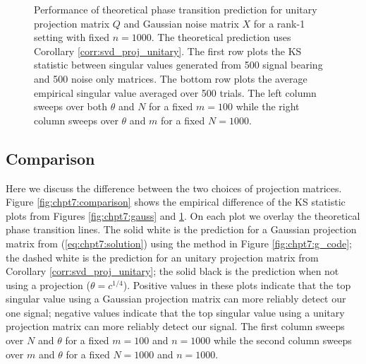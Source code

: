 \begin{figure}
\begin{center}
{  }
  \caption{Performance of theoretical phase transition prediction for unitary projection
    matrix $Q$ and Gaussian noise matrix $X$ for a rank-1 setting with fixed $n=1000$. The
    theoretical prediction uses Corollary \ref{corr:svd_proj_unitary}. The first row plots
    the KS statistic between singular values generated from 500 signal bearing and 500
    noise only matrices. The bottom row plots the average empirical singular value
    averaged over 500 trials. The left column sweeps over both $\theta$ and $N$ for a
    fixed $m=100$ while the right column sweeps over $\theta$ and $m$ for a fixed
    $N=1000$.}
  \label{fig:chpt7:orth_g}
\end{center}
\end{figure}

\subsection{Comparison}

Here we discuss the difference between the two choices of projection matrices. Figure
\ref{fig:chpt7:comparison} shows the empirical difference of the KS statistic plots from
Figures \ref{fig:chpt7:gauss} and \ref{fig:chpt7:orth_g}. On each plot we overlay the
theoretical phase transition lines. The solid white is the prediction for a Gaussian
projection matrix from (\ref{eq:chpt7:solution}) using the method in Figure
\ref{fig:chpt7:g_code}; the dashed white is the prediction for an unitary projection matrix
from Corollary \ref{corr:svd_proj_unitary}; the solid black is the prediction when
not using a projection ($\theta=c^{1/4}$). Positive values in these plots indicate that
the top singular value using a Gaussian projection matrix can more reliably detect our one
signal; negative values indicate that the top singular value using a unitary projection
matrix can more reliably detect our signal. The first column sweeps over $N$ and $\theta$
for a fixed $m=100$ and $n=1000$ while the second column sweeps over $m$ and $\theta$ for
a fixed $N=1000$ and $n=1000$.

